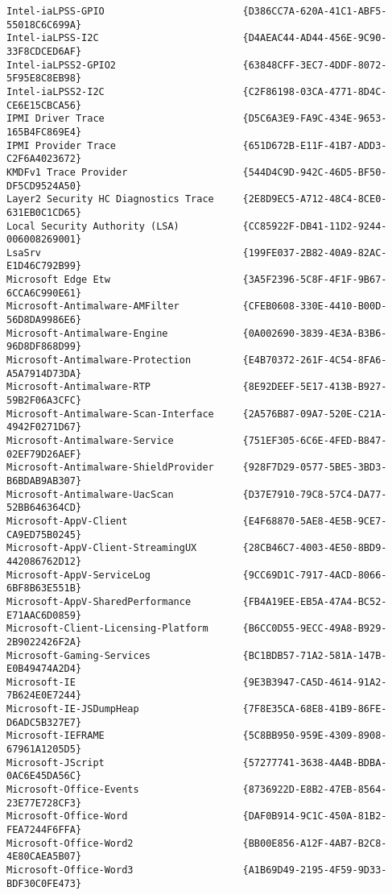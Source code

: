 \documentclass{report}
\begin{document}
\begin{lstlisting}[breaklines=true,basicstyle=\tiny]
Intel-iaLPSS-GPIO                        {D386CC7A-620A-41C1-ABF5-55018C6C699A}
Intel-iaLPSS-I2C                         {D4AEAC44-AD44-456E-9C90-33F8CDCED6AF}
Intel-iaLPSS2-GPIO2                      {63848CFF-3EC7-4DDF-8072-5F95E8C8EB98}
Intel-iaLPSS2-I2C                        {C2F86198-03CA-4771-8D4C-CE6E15CBCA56}
IPMI Driver Trace                        {D5C6A3E9-FA9C-434E-9653-165B4FC869E4}
IPMI Provider Trace                      {651D672B-E11F-41B7-ADD3-C2F6A4023672}
KMDFv1 Trace Provider                    {544D4C9D-942C-46D5-BF50-DF5CD9524A50}
Layer2 Security HC Diagnostics Trace     {2E8D9EC5-A712-48C4-8CE0-631EB0C1CD65}
Local Security Authority (LSA)           {CC85922F-DB41-11D2-9244-006008269001}
LsaSrv                                   {199FE037-2B82-40A9-82AC-E1D46C792B99}
Microsoft Edge Etw                       {3A5F2396-5C8F-4F1F-9B67-6CCA6C990E61}
Microsoft-Antimalware-AMFilter           {CFEB0608-330E-4410-B00D-56D8DA9986E6}
Microsoft-Antimalware-Engine             {0A002690-3839-4E3A-B3B6-96D8DF868D99}
Microsoft-Antimalware-Protection         {E4B70372-261F-4C54-8FA6-A5A7914D73DA}
Microsoft-Antimalware-RTP                {8E92DEEF-5E17-413B-B927-59B2F06A3CFC}
Microsoft-Antimalware-Scan-Interface     {2A576B87-09A7-520E-C21A-4942F0271D67}
Microsoft-Antimalware-Service            {751EF305-6C6E-4FED-B847-02EF79D26AEF}
Microsoft-Antimalware-ShieldProvider     {928F7D29-0577-5BE5-3BD3-B6BDAB9AB307}
Microsoft-Antimalware-UacScan            {D37E7910-79C8-57C4-DA77-52BB646364CD}
Microsoft-AppV-Client                    {E4F68870-5AE8-4E5B-9CE7-CA9ED75B0245}
Microsoft-AppV-Client-StreamingUX        {28CB46C7-4003-4E50-8BD9-442086762D12}
Microsoft-AppV-ServiceLog                {9CC69D1C-7917-4ACD-8066-6BF8B63E551B}
Microsoft-AppV-SharedPerformance         {FB4A19EE-EB5A-47A4-BC52-E71AAC6D0859}
Microsoft-Client-Licensing-Platform      {B6CC0D55-9ECC-49A8-B929-2B9022426F2A}
Microsoft-Gaming-Services                {BC1BDB57-71A2-581A-147B-E0B49474A2D4}
Microsoft-IE                             {9E3B3947-CA5D-4614-91A2-7B624E0E7244}
Microsoft-IE-JSDumpHeap                  {7F8E35CA-68E8-41B9-86FE-D6ADC5B327E7}
Microsoft-IEFRAME                        {5C8BB950-959E-4309-8908-67961A1205D5}
Microsoft-JScript                        {57277741-3638-4A4B-BDBA-0AC6E45DA56C}
Microsoft-Office-Events                  {8736922D-E8B2-47EB-8564-23E77E728CF3}
Microsoft-Office-Word                    {DAF0B914-9C1C-450A-81B2-FEA7244F6FFA}
Microsoft-Office-Word2                   {BB00E856-A12F-4AB7-B2C8-4E80CAEA5B07}
Microsoft-Office-Word3                   {A1B69D49-2195-4F59-9D33-BDF30C0FE473}

\end{lstlisting}
\end{document}
